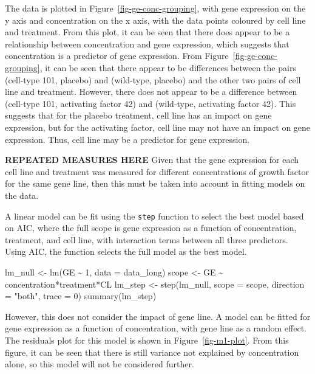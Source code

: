 \documentclass[
  letterpaper,
  DIV=11,
  numbers=noendperiod]{scrartcl}
\newenvironment{Shaded}{\begin{snugshade}}{\end{snugshade}}
\newcommand{\NormalTok}[1]{\textcolor[rgb]{0.00,0.23,0.31}{#1}}
\begin{document}
The data is plotted in Figure~\ref{fig-ge-conc-grouping}, with gene
expression on the y axis and concentration on the x axis, with the data
points coloured by cell line and treatment. From this plot, it can be
seen that there does appear to be a relationship between concentration
and gene expression, which suggests that concentration is a predictor of
gene expression. From Figure~\ref{fig-ge-conc-grouping}, it can be seen
that there appear to be differences between the pairs (cell-type 101,
placebo) and (wild-type, placebo) and the other two pairs of cell line
and treatment. However, there does not appear to be a difference between
(cell-type 101, activating factor 42) and (wild-type, activating factor
42). This suggests that for the placebo treatment, cell line has an
impact on gene expression, but for the activating factor, cell line may
not have an impact on gene expression. Thus, cell line may be a
predictor for gene expression.

\textbf{REPEATED MEASURES HERE} Given that the gene expression for each
cell line and treatment was measured for different concentrations of
growth factor for the same gene line, then this must be taken into
account in fitting models on the data.

A linear model can be fit using the \texttt{step} function to select the
best model based on AIC, where the full scope is gene expression as a
function of concentration, treatment, and cell line, with interaction
terms between all three predictors. Using AIC, the function selects the
full model as the best model.

\begin{Shaded}
\begin{Highlighting}[]
\NormalTok{lm\_null \textless{}{-} lm(GE \textasciitilde{} 1, data = data\_long)}
\NormalTok{scope \textless{}{-} GE \textasciitilde{} concentration*treatment*CL}
\NormalTok{lm\_step \textless{}{-} step(lm\_null, scope = scope, direction = "both", trace = 0)}
\NormalTok{summary(lm\_step)}
\end{Highlighting}
\end{Shaded}

However, this does not consider the impact of gene line. A model can be
fitted for gene expression as a function of concentration, with gene
line as a random effect. The residuals plot for this model is shown in
Figure~\ref{fig-m1-plot}. From this figure, it can be seen that there is
still variance not explained by concentration alone, so this model will
not be considered further.
\end{document}
